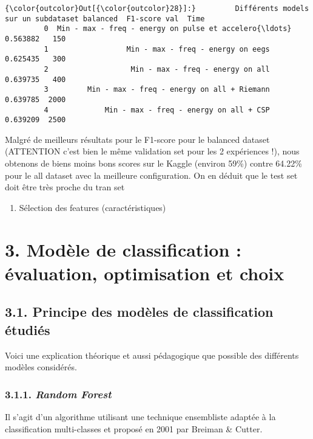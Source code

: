 \documentclass[11pt]{article}
\providecommand{\tightlist}{%
      \setlength{\itemsep}{0pt}\setlength{\parskip}{0pt}}
\begin{document}
\begin{Verbatim}[commandchars=\\\{\}]
{\color{outcolor}Out[{\color{outcolor}28}]:}         Différents models sur un subdataset balanced  F1-score val  Time
         0  Min - max - freq - energy on pulse et accelero{\ldots}      0.563882   150
         1                  Min - max - freq - energy on eegs      0.625435   300
         2                   Min - max - freq - energy on all      0.639735   400
         3         Min - max - freq - energy on all + Riemann      0.639785  2000
         4             Min - max - freq - energy on all + CSP      0.639209  2500
\end{Verbatim}
            
    Malgré de meilleurs résultats pour le F1-score pour le balanced dataset
(ATTENTION c'est bien le même validation set pour les 2 expériences !),
nous obtenons de biens moins bons scores sur le Kaggle (environ 59\%)
contre 64.22\% pour le all dataset avec la meilleure configuration. On
en déduit que le test set doit être très proche du tran set

    \begin{enumerate}
\def\labelenumi{\arabic{enumi}.}
\setcounter{enumi}{2}
\tightlist
\item
  Sélection des features (caractéristiques)
\end{enumerate}

    \section{3. Modèle de classification : évaluation, optimisation et
choix}\label{moduxe8le-de-classification-uxe9valuation-optimisation-et-choix}

\subsection{3.1. Principe des modèles de classification
étudiés}\label{principe-des-moduxe8les-de-classification-uxe9tudiuxe9s}

Voici une explication théorique et aussi pédagogique que possible des
différents modèles considérés.

    \subsubsection{\texorpdfstring{3.1.1. \emph{Random
Forest}}{3.1.1. Random Forest}}\label{random-forest}

Il s'agit d'un algorithme utilisant une technique ensembliste adaptée à
la classification multi-classes et proposé en 2001 par Breiman \&
Cutter.
\end{document}
